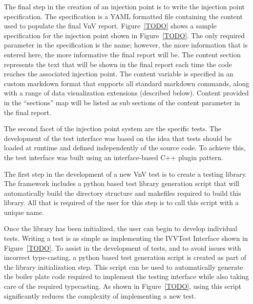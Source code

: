 
The final step in the creation of an injection point is to write the injection point specification. The specification is a YAML formatted 
file containing the content used to populate the final VnV report. Figure~\ref{TODO} shows a sample specification for the 
injection point shown in Figure~\ref{TODO}. The only required parameter in the specification is the name; however, the more information that is entered here, the more informative the final report will be. The content section represents the text that will be shown in the final report each time the code reaches the associated injection point. The content variable is specified  in an custom markdown format that supports all standard markdown commands, along with a range of data visualization extensions (described below). Content provided in the ``sections'' map will be listed as sub sections of the content parameter in the final report. 

The second facet of the injection point system are the specific \VV tests. The development of the 
test interface was based on the idea that tests should be loaded at runtime and defined independently of the source code. To achieve this, the test
interface was built using an interface-based C++ plugin pattern.

The first step in the development of a new VnV test is to create a testing library. The framework includes a python
based test library generation script that will automatically build the directory structure and makefiles required to 
build this library. All that is required of the user for this step is to call this script with a unique name. 

Once the library has been initialized, the user can begin to develop individual tests. Writing a test is as simple as implementing the IVVTest Interface shown in Figure~\ref{TODO}. To assist in the development of tests, and to avoid issues with incorrect type-casting, a python based test generation script is created as part of the library initialization step. This script can be used to automatically generate the boiler plate code required to implement the testing interface while also taking care of the required typecasting. As shown in Figure~\ref{TODO}, using this script significantly reduces the complexity of implementing a new test. 

